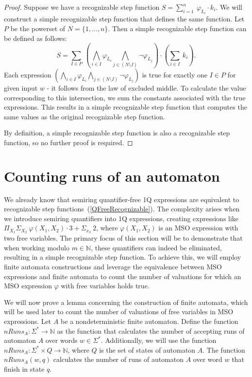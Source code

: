 \documentclass[en]{pracamgr}
\theoremstyle{definition}
\begin{document}
\begin{proof}
    Suppose we have a recognizable step function $S = \sum_{i = 1}^{n} \ \varphi_{L_i} \cdot k_i$. We will construct a simple recognizable step function that defines the same function. Let $P$ be the powerset of $N = \{1,\ldots,n\}$. Then a simple recognizable step function can be defined as follows:
    $$S = \sum_{I \in P} \ (\bigwedge_{i \in I} \varphi_{L_i} \bigwedge_{j \in (N \setminus I)} \neg \varphi_{L_j}) \cdot (\sum_{i \in I} \ k_i).$$
    Each expression $(\bigwedge_{i \in I} \varphi_{L_i} \bigwedge_{j \in (N \setminus I)} \neg \varphi_{L_j})$ is true for exactly one $I \in P$ for given input $w$ - it follows from the law of excluded middle. To calculate the value corresponding to this intersection, we sum the constants associated with the true expressions. This results in a simple recognizable step function that computes the same values as the original recognizable step function.

    By definition, a simple recognizable step function is also a recognizable step function, so no further proof is required.
\end{proof}

\section{Counting runs of an automaton}

We already know that semiring quantifier-free 1Q expressions are equivalent to recognizable step functions~(\cref{QFreeRecognizable}). The complexity arises when we introduce semiring quantifiers into 1Q expressions, creating expressions like $\Pi_{X_1} \Sigma_{X_2} \ \varphi(X_1, X_2) \cdot 3 + \Sigma_{x_3} \ 2$, where $\varphi(X_1, X_2)$ is an MSO expression with two free variables. The primary focus of this section will be to demonstrate that when working modulo $m \in \mathbb{N}$, these quantifiers can indeed be eliminated, resulting in a simple recognizable step function. To achieve this, we will employ finite automata constructions and leverage the equivalence between MSO expressions and finite automata to count the number of valuations for which an MSO expression $\varphi$ with free variables holds true.

We will now prove a lemma concerning the construction of finite automata, which will be used later to count the number of valuations of free variables in MSO expressions. Let $A$ be a nondeterministic finite automaton. Define the function $nRuns_A : \Sigma^* \rightarrow \mathbb{N}$ as the function that calculates the number of accepting runs of automaton $A$ over words $w \in \Sigma^*$. Additionally, we will use the function $nRuns_A : \Sigma^* \times Q \rightarrow \mathbb{N}$, where $Q$ is the set of states of automaton $A$. The function $nRuns_A(w, q)$ calculates the number of runs of automaton $A$ over word $w$ that finish in state $q$.
\end{document}
